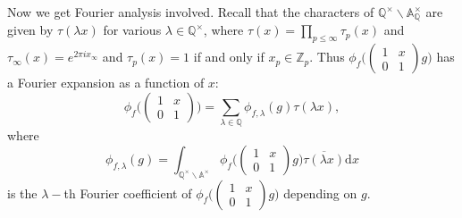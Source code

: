 \documentclass[12pt,a4paper,english]{article}
\theoremstyle{plain}
\theoremstyle{definition}
\begin{document}
Now we get Fourier analysis involved. Recall that the characters of $\mathbb{Q}^{\times}\backslash\mathbb{A}_{\mathbb{Q}}^{\times}$ are given by $\tau(\lambda x)$ for various $\lambda\in\mathbb{Q}^{\times}$, where $\tau(x)=\prod_{p\leq \infty}\tau_{p}(x)$ and $\tau_{\infty}(x)=e^{2\pi ix_{\infty}}$ and $\tau_{p}(x)=1$ if and only if $x_{p}\in \mathbb{Z}_{p}$. Thus $    \phi_{f}\bigg(\begin{pmatrix}
    1&x\\
    0&1
    \end{pmatrix}g\bigg)$ has a Fourier expansion as a function of $x$:
\begin{equation*}
    \phi_{f}\bigg(\begin{pmatrix}
    1&x\\
    0&1
    \end{pmatrix}\bigg)=\sum_{\lambda\in\mathbb{Q}}\phi_{f,\lambda}(g)\tau(\lambda x),
\end{equation*}
where 
\begin{equation*}
    \phi_{f,\lambda}(g)=\int_{\mathbb{Q}^{\times}\backslash\mathbb{A}^{\times}}\phi_{f}\bigg(\begin{pmatrix}
    1&x\\
    0&1
    \end{pmatrix}g\bigg)\overline{\tau(\lambda x)}\text{d}x
\end{equation*}
is the $\lambda-$th Fourier coefficient of $\phi_{f}\bigg(\begin{pmatrix}
    1&x\\
    0&1
    \end{pmatrix}g\bigg)$ depending on $g$.
\end{document}
